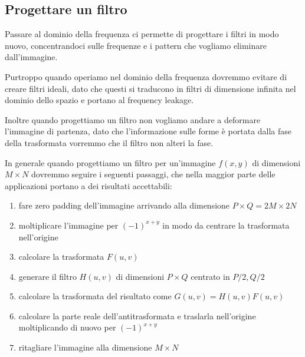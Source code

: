 \subsection{Progettare un filtro}
Passare al dominio della frequenza ci permette di progettare i filtri in modo nuovo, concentrandoci sulle frequenze e i pattern che vogliamo eliminare dall'immagine.

Purtroppo quando operiamo nel dominio della frequenza dovremmo evitare di creare filtri ideali, dato che questi si traducono in filtri di dimensione infinita nel dominio dello spazio e portano al frequency leakage.

Inoltre quando progettiamo un filtro non vogliamo andare a deformare l'immagine di partenza, dato che l'informazione sulle forme è portata dalla fase della trasformata vorremmo che il filtro non alteri la fase.

In generale quando progettiamo un filtro per un'immagine $f(x,y)$ di dimensioni $M\times N$ dovremmo seguire i seguenti passaggi, che nella maggior parte delle applicazioni portano a dei risultati accettabili:
\begin{enumerate}
	\item fare zero padding dell'immagine arrivando alla dimensione $P\times Q = 2M\times 2N$
	\item moltiplicare l'immagine per $(-1)^{x+y}$ in modo da centrare la trasformata nell'origine
	\item calcolare la trasformata $F(u,v)$
	\item generare il filtro $H(u,v)$ di dimensioni $P\times Q$ centrato in $P/2, Q/2$
	\item calcolare la trasformata del risultato come $G(u,v) = H(u,v)F(u,v)$
	\item calcolare la parte reale dell'antitrasformata e traslarla nell'origine moltiplicando di nuovo per $(-1)^{x+y}$
	\item ritagliare l'immagine alla dimensione $M\times N$
\end{enumerate}
